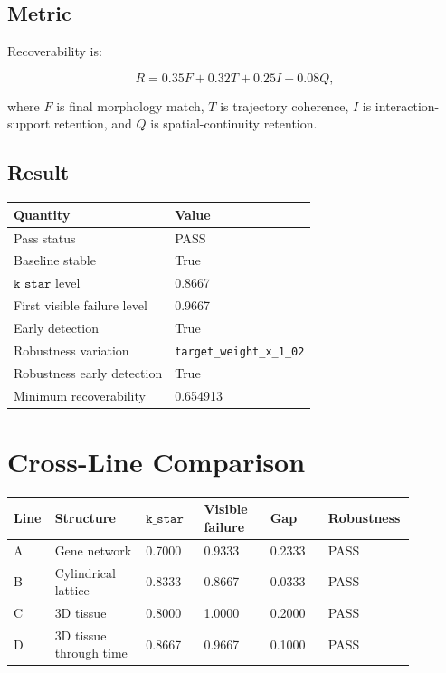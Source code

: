 \documentclass[11pt]{article}
\begin{document}
\subsection{Metric}

Recoverability is:

\[
R=0.35F+0.32T+0.25I+0.08Q,
\]

where \(F\) is final morphology match, \(T\) is trajectory coherence, \(I\) is interaction-support retention, and \(Q\) is spatial-continuity retention.

\subsection{Result}

\begin{center}
\begin{tabular}{ll}
\toprule
Quantity & Value \\
\midrule
Pass status & PASS \\
Baseline stable & True \\
\(\texttt{k\_star}\) level & 0.8667 \\
First visible failure level & 0.9667 \\
Early detection & True \\
Robustness variation & \texttt{target\_weight\_x\_1\_02} \\
Robustness early detection & True \\
Minimum recoverability & 0.654913 \\
\bottomrule
\end{tabular}
\end{center}

\section{Cross-Line Comparison}

\begin{longtable}{p{0.08\linewidth}p{0.22\linewidth}p{0.14\linewidth}p{0.16\linewidth}p{0.14\linewidth}p{0.14\linewidth}}
\toprule
Line & Structure & \(\texttt{k\_star}\) & Visible failure & Gap & Robustness \\
\midrule
A & Gene network & 0.7000 & 0.9333 & 0.2333 & PASS \\
B & Cylindrical lattice & 0.8333 & 0.8667 & 0.0333 & PASS \\
C & 3D tissue & 0.8000 & 1.0000 & 0.2000 & PASS \\
D & 3D tissue through time & 0.8667 & 0.9667 & 0.1000 & PASS \\
\bottomrule
\end{longtable}
\end{document}
